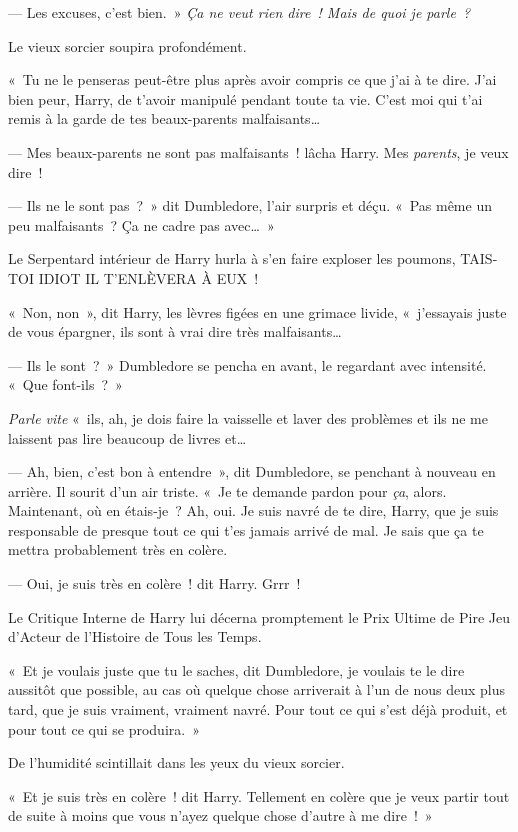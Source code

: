 --- Les excuses, c'est bien.~» \emph{Ça ne veut rien dire~! Mais de quoi je parle~?}

Le vieux sorcier soupira profondément.

«~Tu ne le penseras peut-être plus après avoir compris ce que j'ai à te dire. J'ai bien peur, Harry, de t'avoir manipulé pendant toute ta vie. C'est moi qui t'ai remis à la garde de tes beaux-parents malfaisants…

--- Mes beaux-parents ne sont pas malfaisants~! lâcha Harry. Mes \emph{parents}, je veux dire~!

--- Ils ne le sont pas~?~» dit Dumbledore, l'air surpris et déçu. «~Pas même un peu malfaisants~? Ça ne cadre pas avec…~»

Le Serpentard intérieur de Harry hurla à s'en faire exploser les poumons, TAIS-TOI IDIOT IL T'ENLÈVERA À EUX~!

«~Non, non~», dit Harry, les lèvres figées en une grimace livide, «~j'essayais juste de vous épargner, ils sont à vrai dire très malfaisants…

--- Ils le sont~?~» Dumbledore se pencha en avant, le regardant avec intensité. «~Que font-ils~?~»

\emph{Parle vite} «~ils, ah, je dois faire la vaisselle et laver des problèmes et ils ne me laissent pas lire beaucoup de livres et…

--- Ah, bien, c'est bon à entendre~», dit Dumbledore, se penchant à nouveau en arrière. Il sourit d'un air triste. «~Je te demande pardon pour \emph{ça}, alors. Maintenant, où en étais-je~? Ah, oui. Je suis navré de te dire, Harry, que je suis responsable de presque tout ce qui t'es jamais arrivé de mal. Je sais que ça te mettra probablement très en colère.

--- Oui, je suis très en colère~! dit Harry. Grrr~!

Le Critique Interne de Harry lui décerna promptement le Prix Ultime de Pire Jeu d'Acteur de l'Histoire de Tous les Temps.

«~Et je voulais juste que tu le saches, dit Dumbledore, je voulais te le dire aussitôt que possible, au cas où quelque chose arriverait à l'un de nous deux plus tard, que je suis vraiment, vraiment navré. Pour tout ce qui s'est déjà produit, et pour tout ce qui se produira.~»

De l'humidité scintillait dans les yeux du vieux sorcier.

«~Et je suis très en colère~! dit Harry. Tellement en colère que je veux partir tout de suite à moins que vous n'ayez quelque chose d'autre à me dire~!~»

